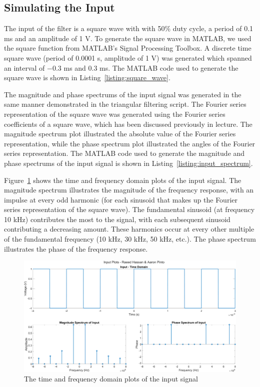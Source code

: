 \documentclass[12pt]{article}
\begin{document}
\subsection*{Simulating the Input}
The input of the filter is a square wave with with 50\% duty cycle, a period of 0.1 ms and an amplitude of 1 V. To generate the square wave in MATLAB, we used the square function from MATLAB's Signal Processing Toolbox. A discrete time square wave (period of 0.0001 s, amplitude of 1 V) was generated which spanned an interval of $-0.3$ ms and $0.3$ ms. The MATLAB code used to generate the square wave is shown in Listing~\ref{listing:square_wave}.


The magnitude and phase spectrums of the input signal was generated in the same manner demonstrated in the triangular filtering script. The Fourier series representation of the square wave was generated using the Fourier series coefficients of a square wave, which has been discussed previously in lecture. The magnitude spectrum plot illustrated the absolute value of the Fourier series representation, while the phase spectrum plot illustrated the angles of the Fourier series representation. The MATLAB code used to generate the magnitude and phase spectrums of the input signal is shown in Listing~\ref{listing:input_spectrum}.


Figure~\ref{fig:input} shows the time and frequency domain plots of the input signal. The magnitude spectrum illustrates the magnitude of the frequency response, with an impulse at every odd harmonic (for each sinusoid that makes up the Fourier series representation of the square wave). The fundamental sinusoid (at frequency 10 kHz) contributes the most to the signal, with each subsequent sinusoid contributing a decreasing amount. These harmonics occur at every other multiple of the fundamental frequency (10 kHz, 30 kHz, 50 kHz, etc.). The phase spectrum illustrates the phase of the frequency response. %
\begin{figure}[h!]
    \includegraphics[width=\textwidth]{input.png}
    \caption{\label{fig:input} The time and frequency domain plots of the input signal}
\end{figure} \\
\end{document}
